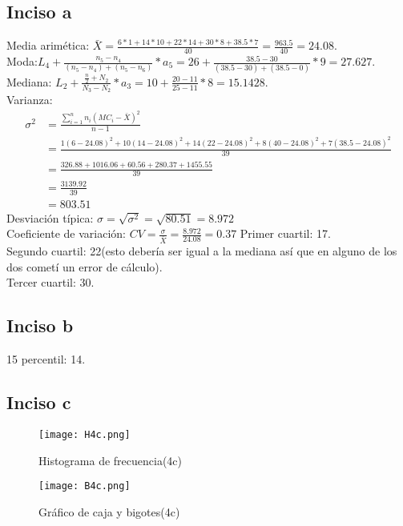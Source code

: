 \documentclass[a4paper,12pt]{article}
\begin{document}
\subsection*{Inciso a}
Media arimética: $ \bar{X} = \frac{6*1+14*10+22*14+30*8+38.5*7}{40} = \frac{963.5}{40} = 24.08$.\\
Moda:$ L_4 + \frac{n_5 -n_4}{(n_5 -n_4)+(n_5 - n_6)} * a_5 =  26 + \frac{38.5 -30}{(38.5-30) + (38.5 - 0)} * 9 = 27.627$.\\
Mediana: $ L_2 + \frac{\frac{n}{2} + N_2}{N_3 - N_2}*a_3 = 10 + \frac{20-11}{25-11}*8 = 15.1428 $.\\
Varianza:\begin{align*}
	\sigma^{2} &=\frac{\sum_{i=1}^{n}n_{i}(MC_{i}-\bar{X})^{2}}{n-1}\\
	&=\frac{1(6-24.08)^{2}+10(14-24.08)^{2}+14(22-24.08)^{2}+8(40-24.08)^{2}+7(38.5-24.08)^{2}}{39}\\
	&=\frac{326.88+1016.06+60.56+280.37+1455.55}{39}\\
	&=\frac{3139.92}{39}\\
	&= 803.51
\end{align*}
Desviación típica: $ \sigma = \sqrt{\sigma^{2}} = \sqrt{80.51} = 8.972 $\\
Coeficiente de variación: $ CV = \frac{\sigma}{\bar{X}} = \frac{8.972}{24.08} = 0.37 $
Primer cuartil: 17.\\
Segundo cuartil: 22(esto debería ser igual a la mediana así que en alguno de los dos cometí un error de cálculo).\\
Tercer cuartil: 30.

\subsection*{Inciso b}
15 percentil: 14.

\subsection*{Inciso c}
\begin{figure}[htb]%
	\begin{center}
		\texttt{[image: H4c.png]}
	\end{center}
	\caption{Histograma de frecuencia(4c)}
\end{figure}
\begin{figure}[htb]%
	\begin{center}
		\texttt{[image: B4c.png]}
	\end{center}
	\caption{Gráfico de caja y bigotes(4c)}
\end{figure}
\end{document}
